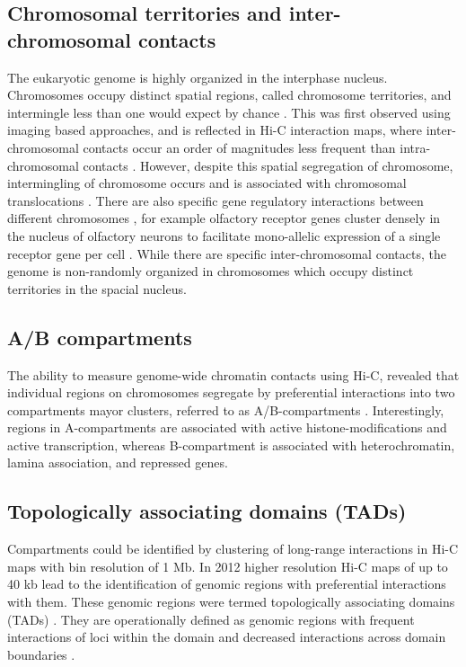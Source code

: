 \documentclass[a4paper,twoside=true,openright,parskip=full,chapterprefix=true,11pt,headings=normal,bibliography=totoc,listof=totoc,titlepage=on,captions=tableabove,draft=false]{scrreprt}
\theoremstyle{definition}
\theoremstyle{definition}
\theoremstyle{definition}
\theoremstyle{remark}
\begin{document}
\subsection{Chromosomal territories and inter-chromosomal
contacts}\label{chromosomal-territories-and-inter-chromosomal-contacts}

The eukaryotic genome is highly organized in the interphase nucleus.
Chromosomes occupy distinct spatial regions, called chromosome
territories, and intermingle less than one would expect by chance
\citep{Cremer2001}. This was first observed using imaging based
approaches, and is reflected in Hi-C interaction maps, where
inter-chromosomal contacts occur an order of magnitudes less frequent
than intra-chromosomal contacts \citep{Lieberman-Aiden2009}. However,
despite this spatial segregation of chromosome, intermingling of
chromosome occurs and is associated with chromosomal translocations
\citep[\citet{Roukos2013}, \citet{Roukos2014}]{Branco2006}. There are
also specific gene regulatory interactions between different chromosomes
\citep{DeLaat2007}, for example olfactory receptor genes cluster densely
in the nucleus of olfactory neurons to facilitate mono-allelic
expression of a single receptor gene per cell \citep{Monahan2015}. While
there are specific inter-chromosomal contacts, the genome is
non-randomly organized in chromosomes which occupy distinct territories
in the spacial nucleus.

\subsection{A/B compartments}\label{ab-compartments}

The ability to measure genome-wide chromatin contacts using Hi-C,
revealed that individual regions on chromosomes segregate by
preferential interactions into two compartments mayor clusters, referred
to as A/B-compartments \citep{Lieberman-Aiden2009}. Interestingly,
regions in A-compartments are associated with active
histone-modifications and active transcription, whereas B-compartment is
associated with heterochromatin, lamina association, and repressed
genes.

\subsection{Topologically associating domains
(TADs)}\label{topologically-associating-domains-tads}

Compartments could be identified by clustering of long-range
interactions in Hi-C maps with bin resolution of 1 Mb. In 2012 higher
resolution Hi-C maps of up to 40 kb lead to the identification of
genomic regions with preferential interactions with them. These genomic
regions were termed topologically associating domains (TADs)
\citep{Dixon2012, Nora2012, Sexton2012}. They are operationally defined
as genomic regions with frequent interactions of loci within the domain
and decreased interactions across domain boundaries
\citep{Merkenschlager2016}.
\end{document}
